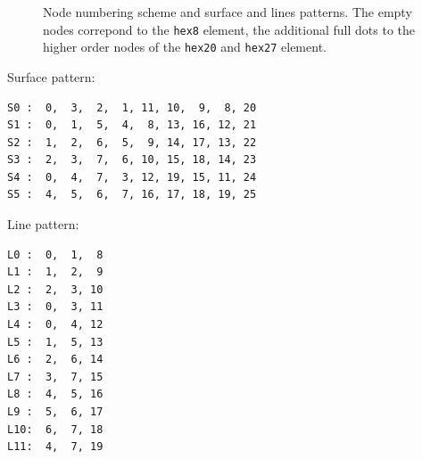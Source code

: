 \begin{figure}[h!]
\begin{center}
\caption{Node numbering scheme and surface and lines patterns. The empty nodes correpond to the \texttt{hex8} element, the additional full dots to the higher order nodes of the \texttt{hex20} and \texttt{hex27} element.}
\label{fig:conventions:hex}
\end{center}
\end{figure}

Surface pattern:
\begin{verbatim}
S0 :  0,  3,  2,  1, 11, 10,  9,  8, 20
S1 :  0,  1,  5,  4,  8, 13, 16, 12, 21
S2 :  1,  2,  6,  5,  9, 14, 17, 13, 22
S3 :  2,  3,  7,  6, 10, 15, 18, 14, 23
S4 :  0,  4,  7,  3, 12, 19, 15, 11, 24
S5 :  4,  5,  6,  7, 16, 17, 18, 19, 25
\end{verbatim}

Line pattern:
\begin{verbatim}
L0 :  0,  1,  8
L1 :  1,  2,  9
L2 :  2,  3, 10
L3 :  0,  3, 11
L4 :  0,  4, 12
L5 :  1,  5, 13
L6 :  2,  6, 14
L7 :  3,  7, 15
L8 :  4,  5, 16
L9 :  5,  6, 17
L10:  6,  7, 18
L11:  4,  7, 19
\end{verbatim}

